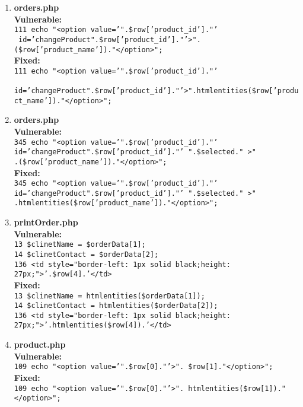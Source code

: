 \documentclass[11pt]{article}
\begin{document}
\begin{enumerate}
	\item \textbf{orders.php} \\
	\textbf{Vulnerable:}\\
	 	\texttt{111 echo "<option value='".\$row['product\_id']."'}\\
	 	\texttt{ id='changeProduct".\$row['product\_id']."'>".(\$row['product\_name'])."</option>";} \\
	\textbf{Fixed:} \\
	 	\texttt{111 echo "<option value='".\$row['product\_id']."'}\\
	 	\texttt{ id='changeProduct".\$row['product\_id']."'>".htmlentities(\$row['product\_name'])."</option>";} 

	\item \textbf{orders.php} \\
	\textbf{Vulnerable:}\\
	 	\texttt{345 echo "<option value='".\$row['product\_id']."' } \\
	 	\texttt{id='changeProduct".\$row['product\_id']."' ".\$selected." >"} \\
	 	\texttt{.(\$row['product\_name'])."</option>";} \\
	\textbf{Fixed:} \\
	 	\texttt{345 echo "<option value='".\$row['product\_id']."' } \\
	 	\texttt{id='changeProduct".\$row['product\_id']."' ".\$selected." >"} \\
	 	\texttt{.htmlentities(\$row['product\_name'])."</option>";} 
	
	\item \textbf{printOrder.php} \\
	\textbf{Vulnerable:} \\ 
		\texttt{13 \$clinetName = \$orderData[1];} \\
		\texttt{14 \$clinetContact = \$orderData[2];} \\
		\texttt{136 <td style="border-left: 1px solid black;height: 27px;">'.\$row[4].'</td>} \\
	\textbf{Fixed:} \\ 
		\texttt{13 \$clinetName = htmlentities(\$orderData[1]);} \\
		\texttt{14 \$clinetContact = htmlentities(\$orderData[2]);} \\
		\texttt{136 <td style="border-left: 1px solid black;height: 27px;">'.htmlentities(\$row[4]).'</td>} \\

	\item \textbf{product.php} \\
	\textbf{Vulnerable:} \\ 
		\texttt{109 echo "<option value='".\$row[0]."'>". \$row[1]."</option>";} \\
	\textbf{Fixed:} \\
		\texttt{109 echo "<option value='".\$row[0]."'>". htmlentities(\$row[1])."</option>";} \\


\end{enumerate}
\end{document}
